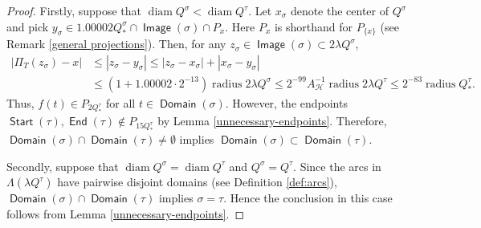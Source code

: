 \documentclass[12pt]{amsart}
\numberwithin{equation}{section}
\theoremstyle{plain}
\theoremstyle{definition}
\newcommand{\radius}{\mathop\mathrm{radius}\nolimits}
\newcommand{\diam}{\mathop\mathrm{diam}\nolimits}
\newcommand{\Start}{\mathop\mathsf{Start}\nolimits}
\newcommand{\End}{\mathop\mathsf{End}\nolimits}
\newcommand{\Domain}{\mathop\mathsf{Domain}\nolimits}
\newcommand{\Image}{\mathop\mathsf{Image}\nolimits}
\numberwithin{figure}{section}
\begin{document}
\begin{proof} Firstly, suppose that $\diam Q^\sigma<\diam Q^\tau$. Let $x_\sigma$ denote the center of $Q^\sigma$ and pick $y_\sigma\in 1.00002Q^\sigma_*\cap \Image(\sigma)\cap P_x$. Here $P_x$ is shorthand for $P_{\{x\}}$ (see Remark \ref{general projections}). Then, for any $z_\sigma\in \Image(\sigma)\subset 2\lambda Q^\sigma$, \begin{equation*}\begin{split}
|\Pi_T(z_\sigma)-x| &\leq |z_\sigma-y_\sigma| \leq |z_\sigma-x_\sigma|+|x_\sigma-y_\sigma| \\ &\leq (1+1.00002\cdot 2^{-13})\radius 2\lambda Q^\sigma
\leq 2^{-99}A_\mathscr{H}^{-1}\radius 2\lambda Q^\tau\leq 2^{-83}\radius Q^\tau_*.\end{split}\end{equation*} Thus, $f(t)\in P_{2Q^\tau_*}$ for all $t\in\Domain(\sigma)$. However, the endpoints $\Start(\tau),\End(\tau)\not\in P_{15Q^\tau_*}$ by Lemma \ref{unnecessary-endpoints}. Therefore, $\Domain(\sigma)\cap\Domain(\tau)\neq\emptyset$ implies $\Domain(\sigma)\subset \Domain(\tau)$.

Secondly, suppose that $\diam Q^\sigma=\diam Q^\tau$ and $Q^\sigma=Q^\tau$. Since the arcs in $\Lambda(\lambda Q^\tau)$ have pairwise disjoint domains (see Definition \ref{def:arcs}), $\Domain(\sigma)\cap\Domain(\tau)$ implies $\sigma=\tau$. Hence the conclusion in this case follows from Lemma \ref{unnecessary-endpoints}.


\end{proof}
\end{document}
